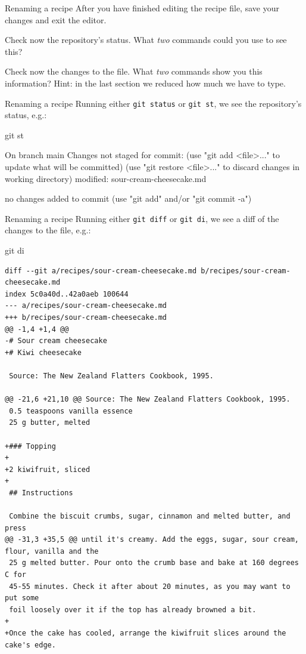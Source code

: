 \begin{frame}[fragile]{Renaming a recipe}
    After you have finished editing the recipe file, save your changes and
    exit the editor.

    Check now the repository's status.  What \emph{two} commands could you
    use to see this?

    Check now the changes to the file.  What \emph{two} commands show you
    this information?  Hint: in the last section we reduced how much we have
    to type.
\end{frame}

\begin{frame}[fragile]{Renaming a recipe}
    Running either \texttt{git status} or \texttt{git
    st}, we see the repository's status, e.g.:

    \begin{shellcode}
        git st
    \end{shellcode}
    \begin{outputcode}
On branch main
Changes not staged for commit:
  (use "git add <file>..." to update what will be committed)
  (use "git restore <file>..." to discard changes in working directory)
        modified:   sour-cream-cheesecake.md

no changes added to commit (use "git add" and/or "git commit -a")
    \end{outputcode}
\end{frame}

\begin{frame}[fragile]{Renaming a recipe}
    Running either \texttt{git diff} or \texttt{git di},
    we see a diff of the changes to the file, e.g.:

    \begin{shellcode}
        git di
    \end{shellcode}
    \begin{verbatim}
diff --git a/recipes/sour-cream-cheesecake.md b/recipes/sour-cream-cheesecake.md
index 5c0a40d..42a0aeb 100644
--- a/recipes/sour-cream-cheesecake.md
+++ b/recipes/sour-cream-cheesecake.md
@@ -1,4 +1,4 @@
-# Sour cream cheesecake
+# Kiwi cheesecake

 Source: The New Zealand Flatters Cookbook, 1995.

@@ -21,6 +21,10 @@ Source: The New Zealand Flatters Cookbook, 1995.
 0.5 teaspoons vanilla essence
 25 g butter, melted

+### Topping
+
+2 kiwifruit, sliced
+
 ## Instructions

 Combine the biscuit crumbs, sugar, cinnamon and melted butter, and press
@@ -31,3 +35,5 @@ until it's creamy. Add the eggs, sugar, sour cream, flour, vanilla and the
 25 g melted butter. Pour onto the crumb base and bake at 160 degrees C for
 45-55 minutes. Check it after about 20 minutes, as you may want to put some
 foil loosely over it if the top has already browned a bit.
+
+Once the cake has cooled, arrange the kiwifruit slices around the cake's edge.
    \end{verbatim}
\end{frame}

